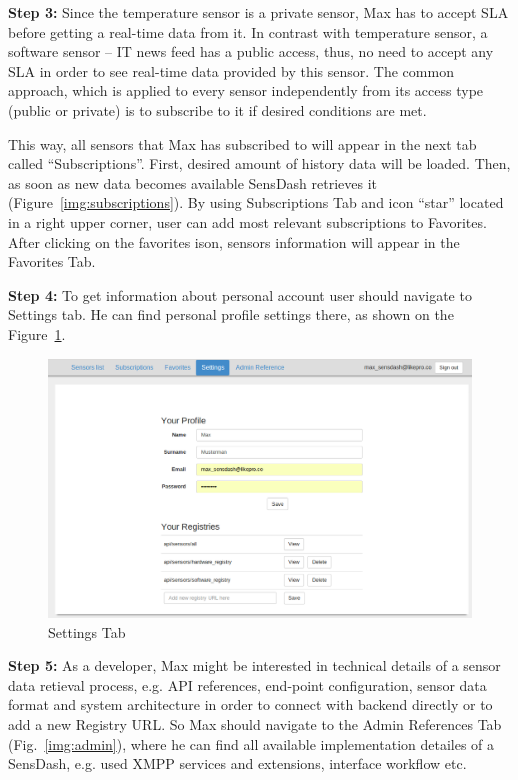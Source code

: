 \textbf{Step 3:} Since the temperature sensor is a private sensor, Max has to accept SLA before getting a real-time data from it. In contrast with temperature sensor, a software sensor -- IT news feed has a public access, thus, no need to accept any SLA in order to see real-time data provided by this sensor. The common approach, which is applied to every sensor independently from its access type (public or private) is to subscribe to it if desired conditions are met.

This way, all sensors that Max has subscribed to will appear in the next tab called ``Subscriptions''. First, desired amount of history data will be loaded. Then, as soon as new data becomes available SensDash retrieves it (Figure~\ref{img:subscriptions}). By using Subscriptions Tab and icon ``star'' located in a right upper corner, user can add most relevant subscriptions to Favorites. After clicking on the favorites ison, sensors information will appear in the Favorites Tab.

\textbf{Step 4:} To get information about personal account user should navigate to Settings tab. He can find personal profile settings there, as shown on the Figure~\ref{img:settings}.

\begin{figure}[!ht]
\centering
\includegraphics[scale=0.6]{Screenshots/UseCaseScreenshot6.png}   
\caption[Settings Tab]{Settings Tab}
\label{img:settings}                         
\end{figure}

\textbf{Step 5:} As a developer, Max might be interested in technical details of a sensor data retieval process, e.g. API references, end-point configuration, sensor data format and system architecture in order to connect with backend directly or to add a new Registry URL. So Max should navigate to the Admin References Tab (Fig.~\ref{img:admin}), where he can find all available implementation detailes of a SensDash, e.g. used XMPP services and extensions, interface workflow etc. 

